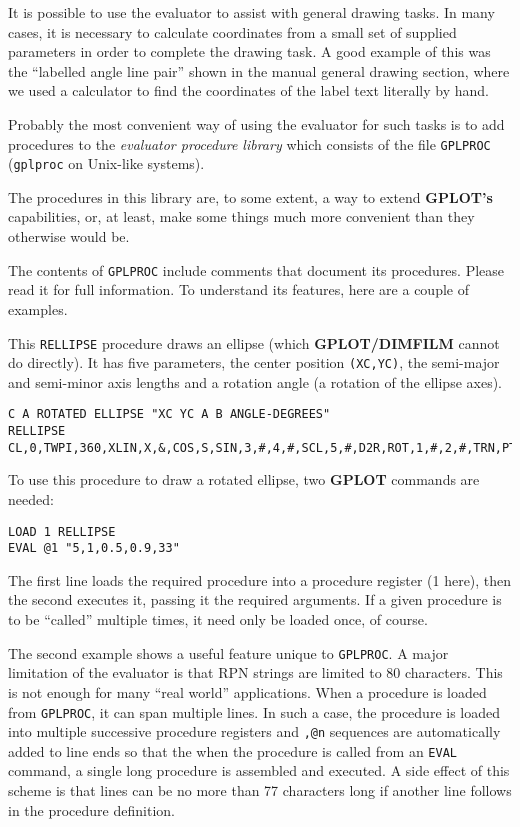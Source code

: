 \documentclass[a4paper,twoside,11pt]{article}
\newcommand{\newpara}{\par\vspace{4mm}\noindent}
\begin{document}
\newpara
It is possible to use the evaluator to assist with general drawing
tasks. In many cases, it is necessary to calculate coordinates from a
small set of supplied parameters in order to complete the drawing task.
A good example of this was the ``labelled angle line pair'' shown in the
manual general drawing section, where we used a calculator to find the
coordinates of the label text literally by hand.

\newpara
Probably the most convenient way of using the evaluator for such tasks
is to add procedures to the \emph{evaluator procedure library} which
consists of the file \texttt{GPLPROC} (\texttt{gplproc} on Unix-like
systems).

\newpara
The procedures in this library are, to some extent, a way to extend
\textbf{GPLOT's} capabilities, or, at least, make some things much more
convenient than they otherwise would be.

\newpara
The contents of \texttt{GPLPROC} include comments that document its
procedures. Please read it for full information. To understand its
features, here are a couple of examples.

\newpara
This \texttt{RELLIPSE} procedure draws an ellipse (which \textbf{GPLOT/DIMFILM}
cannot do directly). It has five parameters, the center position
\texttt{(XC,YC)}, the semi-major and semi-minor axis lengths and a
rotation angle (a rotation of the ellipse axes).

\begin{lstlisting}
C A ROTATED ELLIPSE "XC YC A B ANGLE-DEGREES"
RELLIPSE
CL,0,TWPI,360,XLIN,X,&,COS,S,SIN,3,#,4,#,SCL,5,#,D2R,ROT,1,#,2,#,TRN,PTHC
\end{lstlisting}

\newpara
To use this procedure to draw a rotated ellipse, two \textbf{GPLOT} commands are
needed:

\begin{lstlisting}
LOAD 1 RELLIPSE
EVAL @1 "5,1,0.5,0.9,33"
\end{lstlisting}

\newpara
The first line loads the required procedure into a procedure register (1
here), then the second executes it, passing it the required arguments.
If a given procedure is to be ``called'' multiple times, it need only be
loaded once, of course.

\newpara
The second example shows a useful feature unique to \texttt{GPLPROC}. A
major limitation of the evaluator is that RPN strings are limited to 80
characters. This is not enough for many ``real world'' applications.
When a procedure is loaded from \texttt{GPLPROC}, it can span multiple
lines. In such a case, the procedure is loaded into multiple successive
procedure registers and \texttt{,@n} sequences are automatically added
to line ends so that the when the procedure is called from an
\texttt{EVAL} command, a single long procedure is assembled and
executed. A side effect of this scheme is that lines can be no more than
77 characters long if another line follows in the procedure definition.
\end{document}
